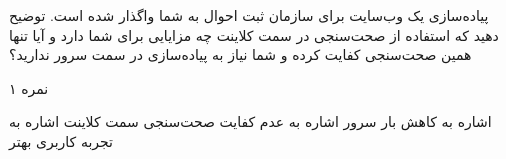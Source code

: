 
پیاده‌سازی یک وب‌سایت برای سازمان ثبت احوال به شما واگذار شده است.
توضیح دهید که استفاده از صحت‌سنجی در سمت کلاینت چه مزایایی برای شما دارد و آیا تنها همین صحت‌سنجی کفایت کرده و شما نیاز به پیاده‌سازی در سمت سرور ندارید؟

۱ نمره

\begin{پاسخ}
 اشاره به کاهش بار سرور
 اشاره به عدم کفایت صحت‌سنجی سمت کلاینت
 اشاره به تجربه کاربری بهتر
\end{پاسخ}
